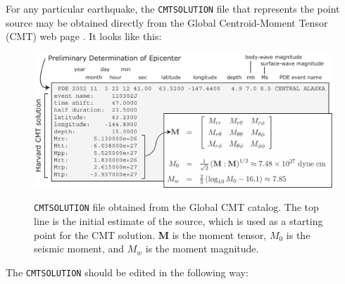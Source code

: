 \newpage
For any particular earthquake, the \texttt{CMTSOLUTION} file that
represents the point source may be obtained directly from the Global Centroid-Moment Tensor (CMT) web page .
It looks like this:

\begin{lyxcode}
{\small }%
\begin{figure}[H]
\noindent \begin{centering}
{\small \includegraphics[width=1\textwidth]{figures/Denali_CMT.pdf} }
\par\end{centering}{\small \par}

\caption{\texttt{CMTSOLUTION} file obtained from the Global CMT catalog. The
top line is the initial estimate of the source, which is used as a
starting point for the CMT solution. \textbf{M} is the moment tensor,
$M_{0}${\small{} }is the seismic moment, and $M_{w}$ is the moment
magnitude.}


\label{fig:CMTSOLUTION-file}
\end{figure}
{\small \par}
\end{lyxcode}
The \texttt{CMTSOLUTION} should be edited in the following way:

